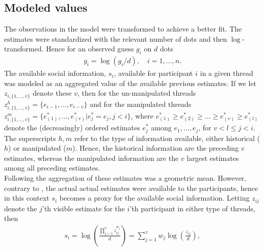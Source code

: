 \documentclass[9pt,a4paper,twocolumn,lineno]{article}
\begin{document}
\subsection*{Modeled values}
The observations in the model were transformed to achieve a better fit. The estimates were standardized with the relevant number of dots and then $\log$-transformed. Hence for an observed guess $g_i$ on $d$ dots 
\begin{align*}
	y_i = \log(g_i/d), \quad i=1,\dots,n.
\end{align*}
The available social information, $s_i$, available for participant $i$ in a given thread was modeled as an aggregated value of the available previous estimates. If we let $z_{i,\{1,\dots,v\}}$ denote these $v$, then for the un-manipulated threads $z^h_{i, \{1,\dots,v\}} = \{e_{i-1},\dots,e_{i-v}\}$ and for the manipulated threads $z^m_{i, \{1,\dots,v\}} = \{e^*_{(1)},\dots,e^*_{(v)} | e^*_j=e_j, j<i\}$, where $e^*_{(1)}\geq e^*_{(2)}\geq\dots\geq e^*_{(v)}\geq e^*_{(l)}$ denote the (decreasingly) ordered estimates $e^*_j$ among $e_1,\dots,e_j$, for $v<l\leq j<i$. The superscripts $h,m$ refer to the type of information available, either historical ($h$) or manipulated ($m$). Hence, the historical information are the preceding $v$ estimates, whereas the manipulated information are the $v$ largest estimates among all preceding estimates. \\
Following \citep{jayles2017social} the aggregation of these estimates was a geometric mean. However, contrary to \citep{jayles2017social}, the actual actual estimates were available to the participants, hence in this context $s_i$ becomes a proxy for the available social information. Letting $z_{ij}$ denote the $j$'th visible estimate for the $i$'th participant in either type of threads, then
\begin{align*}
	s_i = \log\left(\frac{\prod_{j=1}^v z_{ij}^{w_j}}{d}\right) %
	= \sum_{j=1}^v w_j \log\left(\frac{z_{ij}}{d}\right),
\end{align*}
\end{document}
